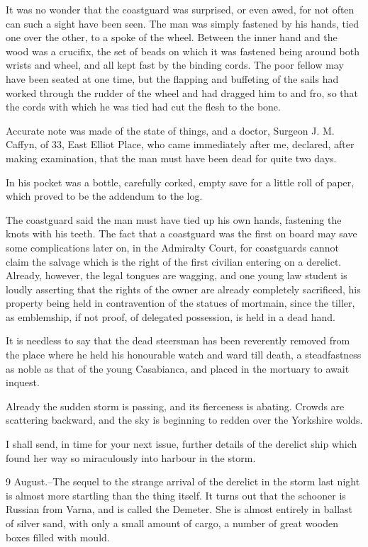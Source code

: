 It was no wonder that the coastguard was surprised, or even awed, for not often can such a sight have been seen. The man was simply fastened by his hands, tied one over the other, to a spoke of the wheel. Between the inner hand and the wood was a crucifix, the set of beads on which it was fastened being around both wrists and wheel, and all kept fast by the binding cords. The poor fellow may have been seated at one time, but the flapping and buffeting of the sails had worked through the rudder of the wheel and had dragged him to and fro, so that the cords with which he was tied had cut the flesh to the bone. 

Accurate note was made of the state of things, and a doctor, Surgeon J. M. Caffyn, of 33, East Elliot Place, who came immediately after me, declared, after making examination, that the man must have been dead for quite two days. 

In his pocket was a bottle, carefully corked, empty save for a little roll of paper, which proved to be the addendum to the log. 

The coastguard said the man must have tied up his own hands, fastening the knots with his teeth. The fact that a coastguard was the first on board may save some complications later on, in the Admiralty Court, for coastguards cannot claim the salvage which is the right of the first civilian entering on a derelict. Already, however, the legal tongues are wagging, and one young law student is loudly asserting that the rights of the owner are already completely sacrificed, his property being held in contravention of the statues of mortmain, since the tiller, as emblemship, if not proof, of delegated possession, is held in a dead hand. 

It is needless to say that the dead steersman has been reverently removed from the place where he held his honourable watch and ward till death, a steadfastness as noble as that of the young Casabianca, and placed in the mortuary to await inquest. 

Already the sudden storm is passing, and its fierceness is abating. Crowds are scattering backward, and the sky is beginning to redden over the Yorkshire wolds. 

I shall send, in time for your next issue, further details of the derelict ship which found her way so miraculously into harbour in the storm. 

9 August.--The sequel to the strange arrival of the derelict in the storm last night is almost more startling than the thing itself. It turns out that the schooner is Russian from Varna, and is called the Demeter. She is almost entirely in ballast of silver sand, with only a small amount of cargo, a number of great wooden boxes filled with mould. 

